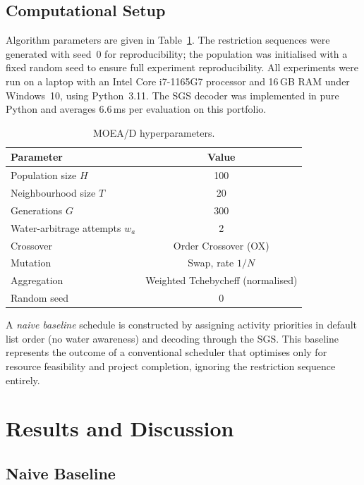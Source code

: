 \documentclass[12pt,a4paper]{article}
\begin{document}
\subsection{Computational Setup}
\label{sec:case:setup}

Algorithm parameters are given in Table~\ref{tab:params}.  The restriction
sequences were generated with seed~0 for reproducibility; the population was
initialised with a fixed random seed to ensure full experiment reproducibility.
All experiments were run on a laptop with an Intel Core i7-1165G7 processor and
16\,GB RAM under Windows~10, using Python~3.11.  The SGS decoder was implemented
in pure Python and averages 6.6\,ms per evaluation on this portfolio.

\begin{table}[h]
\caption{MOEA/D hyperparameters.}
\label{tab:params}
\centering
\begin{tabular}{lc}
\toprule
Parameter & Value \\
\midrule
Population size $H$ & 100 \\
Neighbourhood size $T$ & 20 \\
Generations $G$ & 300 \\
Water-arbitrage attempts $w_a$ & 2 \\
Crossover & Order Crossover (OX) \\
Mutation & Swap, rate $1/N$ \\
Aggregation & Weighted Tchebycheff (normalised) \\
Random seed & 0 \\
\bottomrule
\end{tabular}
\end{table}

A \emph{naive baseline} schedule is constructed by assigning activity priorities in
default list order (no water awareness) and decoding through the SGS.  This baseline represents the outcome of a conventional scheduler that
optimises only for resource feasibility and project completion, ignoring the
restriction sequence entirely.

\section{Results and Discussion}
\label{sec:results}

\subsection{Naive Baseline}
\label{sec:results:naive}
\end{document}

